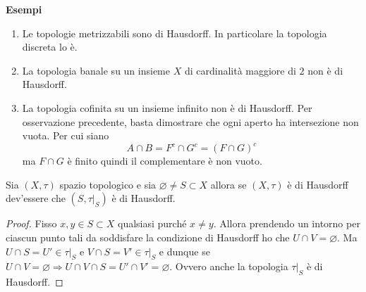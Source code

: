 \textbf{Esempi}
\begin{enumerate}
	\item Le topologie metrizzabili sono di Hausdorff. In particolare la topologia discreta lo è. 
	\item La topologia banale su un insieme $X$ di cardinalità maggiore di $2$ non è di Hausdorff. 
	\item La topologia cofinita su un insieme infinito non è di Hausdorff. Per osservazione precedente, basta dimostrare che ogni aperto ha intersezione non vuota. Per cui siano 
	\begin{equation}
	A \cap B = F^c \cap G^c = (F \cap G)^c 
	\end{equation}
	ma $F\cap G$ è finito quindi il complementare è non vuoto. 
\end{enumerate}

\begin{theorem}
	Sia $(X, \tau)$ spazio topologico e sia $\varnothing \neq S \subset X$ allora se $(X, \tau)$ è di Hausdorff dev'essere che $(S, \tau|_S)$ è di Hausdorff. 
\end{theorem} 
\begin{proof}
	Fisso $x,y \in S \subset X$ qualsiasi purché $x \neq y$. Allora prendendo un intorno per ciascun punto tali da soddisfare la condizione di Hausdorff ho che $U \cap V = \varnothing$. Ma $U \cap S = U' \in \tau|_S$ e $V \cap S = V' \in \tau|_S$ e dunque se $U \cap V = \varnothing \Longrightarrow U \cap V \cap S = U' \cap V' = \varnothing$. Ovvero anche la topologia $\tau|_S$ è di Hausdorff.
\end{proof}


